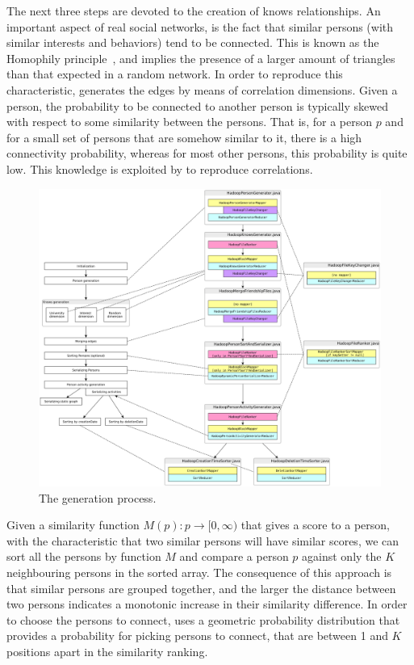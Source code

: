 The next three steps are devoted to the creation of knows relationships.  An
important aspect of real social networks, is the fact that similar persons
(with similar interests and behaviors) tend to be connected. This is known as
the Homophily principle~\cite{mcpherson2001birds,DBLP:journals/socnet/BaroneC18}, and implies the presence of
a larger amount of triangles than that expected in a random network. In order
to reproduce this characteristic, \datagen generates the edges by means of
correlation dimensions.  Given a person, the probability to be connected to
another person is typically skewed with respect to some similarity between the
persons. That is, for a person $p$ and for a small set of persons that are
somehow similar to it, there is a high connectivity probability, whereas for
most other persons, this probability is quite low. This knowledge is
exploited by \datagen to reproduce correlations.

\begin{figure}[H]
    \centering
    \includegraphics[scale=\yedscale]{figures/datagen-workflow}
    \caption{The \datagen generation process.}
    \label{fig:generation_process}
\end{figure}

Given a similarity function $M(p) : p \rightarrow [0, \infty)$ that gives a score to a person,
with the characteristic that two similar persons will have similar scores, we
can sort all the persons by function $M$ and compare a person $p$ against only the
$K$ neighbouring persons in the sorted array. The consequence of this approach is
that similar persons are grouped together, and the larger the
distance between two persons indicates a monotonic increase in their similarity
difference. In order to choose the persons to connect, \datagen uses a geometric
probability distribution that provides a probability for picking persons to
connect, that are between 1 and $K$ positions apart in the similarity
ranking.

